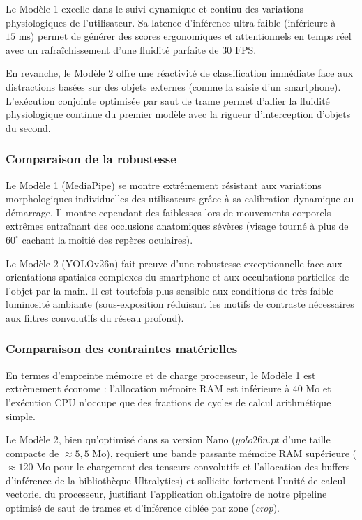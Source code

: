 Le Modèle 1 excelle dans le suivi dynamique et continu des variations physiologiques de l'utilisateur. Sa latence d'inférence ultra-faible (inférieure à $15\text{ ms}$) permet de générer des scores ergonomiques et attentionnels en temps réel avec un rafraîchissement d'une fluidité parfaite de $30\text{ FPS}$. 

En revanche, le Modèle 2 offre une réactivité de classification immédiate face aux distractions basées sur des objets externes (comme la saisie d'un smartphone). L'exécution conjointe optimisée par saut de trame permet d'allier la fluidité physiologique continue du premier modèle avec la rigueur d'interception d'objets du second.

\subsubsection{Comparaison de la robustesse}

Le Modèle 1 (MediaPipe) se montre extrêmement résistant aux variations morphologiques individuelles des utilisateurs grâce à sa calibration dynamique au démarrage. Il montre cependant des faiblesses lors de mouvements corporels extrêmes entraînant des occlusions anatomiques sévères (visage tourné à plus de $60^\circ$ cachant la moitié des repères oculaires).

Le Modèle 2 (YOLOv26n) fait preuve d'une robustesse exceptionnelle face aux orientations spatiales complexes du smartphone et aux occultations partielles de l'objet par la main. Il est toutefois plus sensible aux conditions de très faible luminosité ambiante (sous-exposition réduisant les motifs de contraste nécessaires aux filtres convolutifs du réseau profond).

\subsubsection{Comparaison des contraintes matérielles}

En termes d'empreinte mémoire et de charge processeur, le Modèle 1 est extrêmement économe : l'allocation mémoire RAM est inférieure à $40\text{ Mo}$ et l'exécution CPU n'occupe que des fractions de cycles de calcul arithmétique simple. 

Le Modèle 2, bien qu'optimisé dans sa version Nano ($yolo26n.pt$ d'une taille compacte de $\approx 5,5\text{ Mo}$), requiert une bande passante mémoire RAM supérieure ($\approx 120\text{ Mo}$ pour le chargement des tenseurs convolutifs et l'allocation des buffers d'inférence de la bibliothèque Ultralytics) et sollicite fortement l'unité de calcul vectoriel du processeur, justifiant l'application obligatoire de notre pipeline optimisé de saut de trames et d'inférence ciblée par zone (\textit{crop}).

